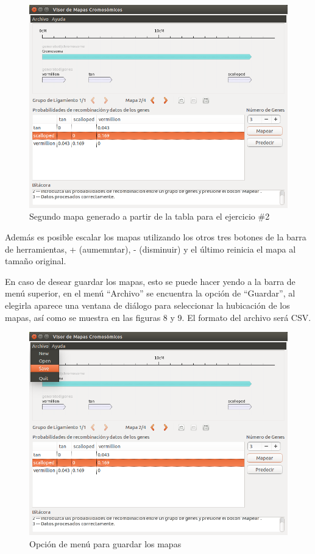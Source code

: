 \documentclass{article}
\begin{document}
	\begin{figure}[h!]
		\centering
			\includegraphics[scale=0.47, keepaspectratio=true]{report4}
				\caption{Segundo mapa generado a partir de la tabla para el ejercicio \#2}
	\end{figure}

	Además es posible escalar los mapas utilizando los otros tres botones de la barra de herramientas, + (aumemntar), - (disminuir) y el último reinicia el mapa al tamaño original.
	
	En caso de desear guardar los mapas, esto se puede hacer yendo a la barra de menú superior, en el menú ``Archivo'' se encuentra la opción de ``Guardar'', al elegirla aparece una ventana de diálogo para seleccionar la hubicación de los mapas, así como se muestra en las figuras 8 y 9. El formato del archivo será CSV.
	
	\begin{figure}[h!]
		\centering
			\includegraphics[scale=0.5, keepaspectratio=true]{report5}
				\caption{Opción de menú para guardar los mapas}
	\end{figure}
	
\end{document}

